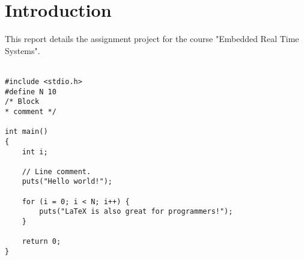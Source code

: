 \section{Introduction}

This report details the assignment project for the course "Embedded Real Time Systems".  \\\\
\begin{lstlisting}[style=customc++, caption=Example listing.]
#include <stdio.h>
#define N 10
/* Block
* comment */

int main()
{
	int i;

	// Line comment.
	puts("Hello world!");

	for (i = 0; i < N; i++) {
		puts("LaTeX is also great for programmers!");
	}

	return 0;
}
\end{lstlisting}